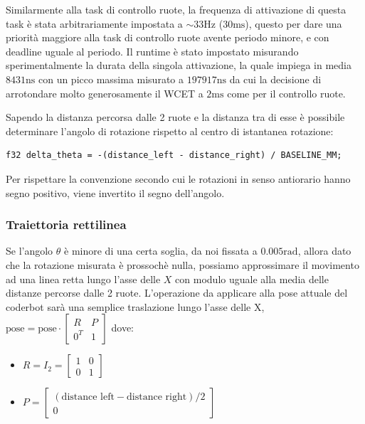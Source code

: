\documentclass[11pt]{article}
\begin{document}
Similarmente alla task di controllo ruote, la frequenza di attivazione di questa task è stata arbitrariamente impostata a \(\sim33\text{Hz}\) (\(30\text{ms}\)), questo per dare una priorità maggiore alla task di controllo ruote avente periodo minore, e con deadline uguale al periodo. Il runtime è stato impostato misurando sperimentalmente la durata della singola attivazione, la quale impiega in media \(8431\text{ns}\) con un picco massima misurato a \(197917\text{ns}\) da cui la decisione di arrotondare molto generosamente il WCET a \(2\text{ms}\) come per il controllo ruote.

Sapendo la distanza percorsa dalle 2 ruote e la distanza tra di esse è possibile determinare l'angolo di rotazione rispetto al centro di istantanea rotazione:
\begin{verbatim}
f32 delta_theta = -(distance_left - distance_right) / BASELINE_MM;
\end{verbatim}
Per rispettare la convenzione secondo cui le rotazioni in senso antiorario hanno segno positivo, viene invertito il segno dell'angolo.
\subsubsection{Traiettoria rettilinea}
\label{sec:orgc92f689}
Se l'angolo \(\theta\) è minore di una certa soglia, da noi fissata a \(0.005\text{rad}\), allora dato che la rotazione misurata è prossochè nulla, possiamo approssimare il movimento ad una linea retta lungo l'asse delle \(X\) con modulo uguale alla media delle distanze percorse dalle 2 ruote.
L'operazione da applicare alla pose attuale del coderbot sarà una semplice traslazione lungo l'asse delle X, \(\text{pose}=\text{pose}\cdot\begin{bmatrix}R&P\\0^T&1\end{bmatrix}\) dove:
\begin{itemize}
\item \(R=I_2=\begin{bmatrix}1&0\\0&1\end{bmatrix}\)
\item \(P= \begin{bmatrix}(\text{distance left} - \text{distance right})/2\\0\end{bmatrix}\)
\end{itemize}
\end{document}
